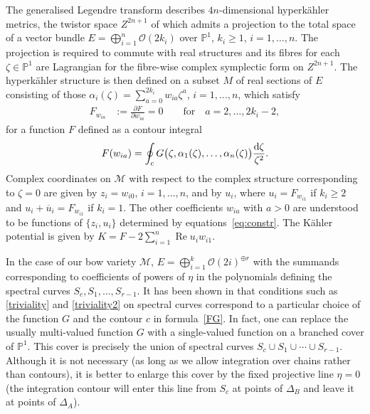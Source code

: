 \documentclass[pdftex]{sigma}
\newcommand{\re}{\operatorname{Re}}
\newcommand{\ol}{\overline}
\numberwithin{equation}{section}
\newcommand{\oP}{{\mathbb{P}}}
\newcommand{\sM}{{\mathcal{M}}} %
\newcommand{\sO}{{\mathcal{O}}}
\begin{document}
{ The generalised Legendre transform describes $4n$-dimensional hyperk\"ahler metrics, the twistor space $Z^{2n+1}$ of which admits a projection to the total space of a vector bundle $E=\bigoplus_{i=1}^n\sO(2k_i)$ over $\oP^1$, $k_i\geq 1$, $i=1,\dots,n$. The projection is required to commute with real structures and its fibres for each $\zeta\in \oP^1$ are Lagrangian for the fibre-wise complex symplectic form on $Z^{2n+1}$. The hyperk\"ahler structure is then defined on a subset $M$ of real sections of $E$ consisting of those $\alpha_i(\zeta)=\sum_{a=0}^{2k_i}w_{ia}\zeta^a$, $i=1,\dots, n$, which satisfy
 \begin{align}\label{eq:constr}
 F_{w_{ia}}&:=\frac{\partial F}{\partial w_{ia}}=0\qquad \text{for}\quad a=2,\dots, 2k_i-2,
 \end{align}
 for a function $F$ defined as a contour integral
 \begin{equation}
 F(w_{ia})=\oint_c G\bigl(\zeta,\alpha_1(\zeta),\dots,\alpha_n(\zeta)\bigr) \frac{{\rm d}\zeta}{\zeta^2}.\label{FG}
 \end{equation}
 Complex coordinates on $\sM$ with respect to the complex structure corresponding to $\zeta=0$ are given by $z_i=w_{i0}$, $i=1,\dots, n$, and by $u_i$, where $ u_i=F_{w_{i1}}$ if $k_i\geq 2$ and $u_i+\ol u_i=F_{w_{i1}}$ if $k_i=1$.
The other coefficients $w_{ia}$ with $a>0$ are understood to be functions of $\{z_i, u_i\}$ determined by equations~\eqref{eq:constr}.
The K\"ahler potential is given by $K=F-2\sum_{i=1}^n\re u_iw_{i1}$.

 In the case of our bow variety $\sM$, $E=\bigoplus_{i=1}^k \sO(2i)^{\oplus r}$ with the summands corresponding to coefficients of powers of $\eta$ in the polynomials defining the spectral curves $S_c,S_1,\dots,S_{r-1}$.
 It has been shown in \cite{BielGZ} that conditions such as \eqref{triviality} and
 \eqref{triviality2} on spectral curves correspond to a particular choice of the function $G$ and the contour $c$ in formula~\eqref{FG}.
 In fact, one can replace the usually multi-valued function $G$ with a single-valued function on a branched cover of $\oP^1$. This cover is precisely the union of spectral curves $S_c\cup S_1\cup\cdots\cup S_{r-1}$. Although it is not necessary (as long as we allow integration over chains rather than contours), it is better to enlarge this cover by the fixed projective line $\eta=0$ (the integration contour will enter this line from $S_c$ at points of $\Delta_B$ and leave it at points of $\Delta_A$).

}
\end{document}
